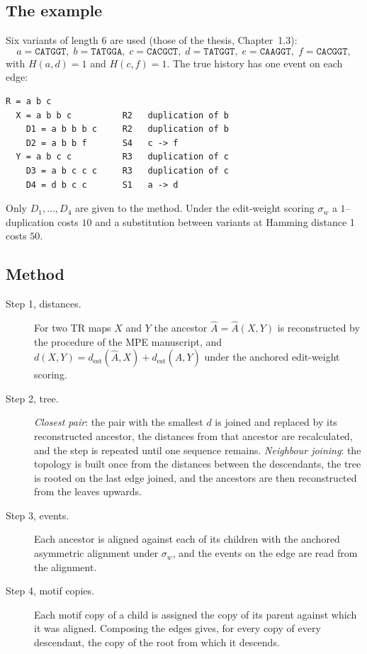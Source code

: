 \documentclass[11pt,a4paper]{article}
\newcommand{\Ahat}{\widehat{A}}
\newcommand{\dest}[2]{d_{\mathrm{est}}(#1,#2)}
\begin{document}
\subsection{The example}
Six variants of length 6 are used (those of the thesis, Chapter~1.3):
\[
a=\texttt{CATGGT},\; b=\texttt{TATGGA},\; c=\texttt{CACGCT},\; d=\texttt{TATGGT},\;
e=\texttt{CAAGGT},\; f=\texttt{CACGGT},
\]
with $H(a,d)=1$ and $H(c,f)=1$. The true history has one event on each edge:
\begin{lstlisting}
R = a b c
  X = a b b c          R2   duplication of b
    D1 = a b b b c     R2   duplication of b
    D2 = a b b f       S4   c -> f
  Y = a b c c          R3   duplication of c
    D3 = a b c c c     R3   duplication of c
    D4 = d b c c       S1   a -> d
\end{lstlisting}
Only $D_1,\ldots,D_4$ are given to the method. Under the edit-weight scoring $\sigma_w$ a
$1$--duplication costs $10$ and a substitution between variants at Hamming distance 1 costs $50$.

\subsection{Method}
\begin{description}
\item[Step 1, distances.] For two TR maps $X$ and $Y$ the ancestor $\Ahat=\Ahat(X,Y)$ is
  reconstructed by the procedure of the MPE manuscript, and
  $d(X,Y)=\dest{\Ahat}{X}+\dest{\Ahat}{Y}$ under the anchored edit-weight scoring.
\item[Step 2, tree.] \emph{Closest pair}: the pair with the smallest $d$ is joined and replaced
  by its reconstructed ancestor, the distances from that ancestor are recalculated, and the step
  is repeated until one sequence remains. \emph{Neighbour joining}: the topology is built once
  from the distances between the descendants, the tree is rooted on the last edge joined, and
  the ancestors are then reconstructed from the leaves upwards.
\item[Step 3, events.] Each ancestor is aligned against each of its children with the anchored
  asymmetric alignment under $\sigma_w$, and the events on the edge are read from the alignment.
\item[Step 4, motif copies.] Each motif copy of a child is assigned the copy of its parent
  against which it was aligned. Composing the edges gives, for every copy of every descendant,
  the copy of the root from which it descends.
\end{description}
\end{document}
